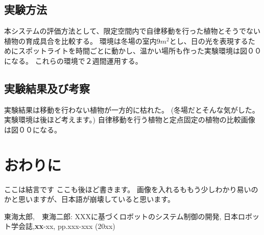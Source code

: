 \documentclass[10pt]{jsarticle}
\begin{document}
\subsection{実験方法}
本システムの評価方法として、限定空間内で自律移動を行った植物とそうでない植物の育成具合を比較する。
環境は冬場の室内$9m^2$とし、日の光を表現するためにスポットライトを時間ごとに動かし、温かい場所も作った実験環境は図００になる。
これらの環境で２週間運用する。
\subsection{実験結果及び考察}
実験結果は移動を行わない植物が一方的に枯れた。
(冬場だとそんな気がした。実験環境は後ほど考えます。)
自律移動を行う植物と定点固定の植物の比較画像は図００になる。
\section{おわりに}
ここは結言です
ここも後ほど書きます。
画像を入れるももう少しわかり易いのかと思いますが、日本語が崩壊していると思います。

\begin{thebibliography}{10}

東海太郎,　東海二郎: XXXに基づくロボットのシステム制御の開発,
日本ロボット学会誌,{\bf xx}-xx, pp.xxx-xxx (20xx)

\end{thebibliography}
\end{document}

